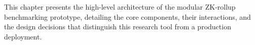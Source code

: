 This chapter presents the high-level architecture of the modular ZK-rollup benchmarking prototype, detailing the core components, their interactions, and the design decisions that distinguish this research tool from a production deployment.
